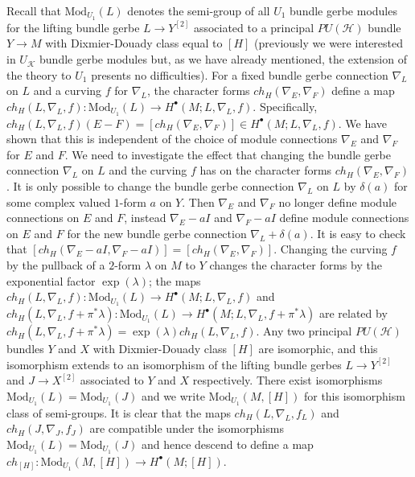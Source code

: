 \documentclass[a4paper,reqno]{amsart}
\theoremstyle{plain}
\theoremstyle{definition}
\theoremstyle{remark}
\numberwithin{equation}{section}
\numberwithin{figure}{section}
\newcommand{\<}{\langle}
\renewcommand{\>}{\rangle}
\begin{document}
Recall that $\text{Mod}_{U_1}(L)$ denotes the 
semi-group of all $U_1$ bundle gerbe modules for 
the lifting bundle gerbe $L\to Y^{[2]}$ associated to 
a principal $PU(\mathcal{H})$ bundle $Y\to M$ with 
Dixmier-Douady class equal to $[H]$ (previously we 
were interested in $U_{\mathcal{K}}$ bundle gerbe 
modules but, as we have already mentioned, 
the extension of the theory to $U_1$ presents no 
difficulties).  
For a fixed bundle gerbe connection $\nabla_L$ on 
$L$ and a curving $f$ for $\nabla_L$, the  
character forms $ch_H(\nabla_E,\nabla_F)$ define a 
map $ch_H(L,\nabla_L,f)\colon \text{Mod}_{U_1}(L) 
\to H^\bullet(M;L,\nabla_L,f)$.  Specifically, $ch_H(L,\nabla_L,f)(E-F) 
= [ch_H(\nabla_E,\nabla_F)] \in H^\bullet(M;L,\nabla_L,f)$.  We have 
shown that this is independent of the choice of module 
connections $\nabla_E$ and $\nabla_F$ for $E$ and 
$F$.     
We need to investigate the effect that changing the 
bundle gerbe connection $\nabla_L$ on $L$ 
and the curving $f$ has on the character forms 
$ch_H(\nabla_E,\nabla_F)$.  It is only possible to 
change the bundle gerbe connection $\nabla_L$ on 
$L$ by $\delta(a)$ for some complex valued $1$-form 
$a$ on $Y$.  Then $\nabla_E$ and $\nabla_F$ no longer 
define module connections on $E$ and $F$, instead 
$\nabla_E - aI$ and $\nabla_F - aI$ define module 
connections on $E$ and $F$ for the new bundle gerbe 
connection $\nabla_L + \delta(a)$.  It is easy 
to check that $[ch_H(\nabla_E - aI,\nabla_F - aI)] = 
[ch_H(\nabla_E,\nabla_F)]$.  
Changing the curving $f$ by 
the pullback of a $2$-form $\lambda$ on $M$ to $Y$ 
changes the character forms by the exponential 
factor $\exp(\lambda)$; the maps $ch_H(L,\nabla_L,f)\colon 
\text{Mod}_{U_1}(L)\to H^\bullet(M;L,\nabla_L,f)$ and 
$ch_H(L,\nabla_L,f+\pi^*\lambda)\colon \text{Mod}_{U_1}(L)\to 
H^\bullet(M;L,\nabla_L,f+\pi^*\lambda)$ are related by 
$ch_H(L,\nabla_L,f+\pi^*\lambda) = \exp(\lambda)ch_H(L,\nabla_L,f)$.  
Any two principal $PU(\mathcal{H})$ bundles 
$Y$ and $X$ with Dixmier-Douady class $[H]$ are isomorphic, 
and this isomorphism extends to an isomorphism of 
the lifting bundle gerbes $L\to Y^{[2]}$ and $J\to X^{[2]}$ 
associated to $Y$ and $X$ respectively.   
There exist isomorphisms $\text{Mod}_{U_1}(L) = 
\text{Mod}_{U_1}(J)$ and we write $\text{Mod}_{U_1}(M,[H])$ 
for this isomorphism class of semi-groups.  It is 
clear that the maps $ch_H(L,\nabla_L,f_L)$ 
and $ch_H(J,\nabla_J,f_J)$ 
are compatible under the isomorphisms $\text{Mod}_{U_1}(L) 
= \text{Mod}_{U_1}(J)$ and hence descend to define a map 
$ch_{[H]}\colon \text{Mod}_{U_1}(M,[H])\to H^\bullet(M;[H])$.  
\end{document}
